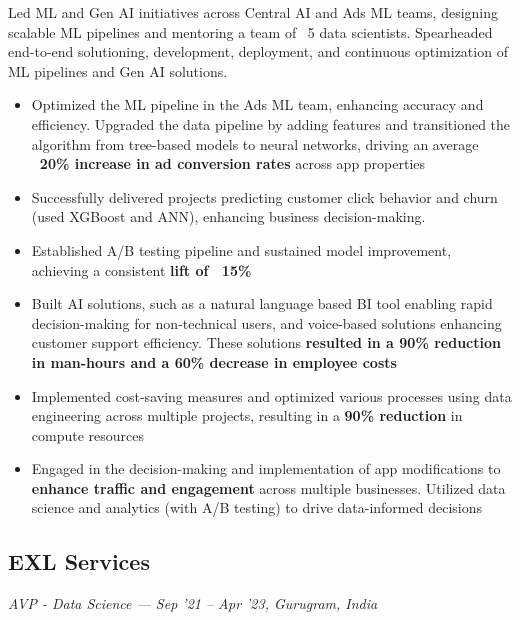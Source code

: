 \documentclass[letterpaper,10pt]{article}
\begin{document}
  Led ML and Gen AI initiatives across Central AI and Ads ML teams, designing scalable ML pipelines and mentoring a team of ~5 data scientists. Spearheaded end-to-end solutioning, development, deployment, and continuous optimization of ML pipelines and Gen AI solutions.
  \begin{itemize}[leftmargin=1em]
    \item Optimized the ML pipeline in the Ads ML team, enhancing accuracy and efficiency. Upgraded the data pipeline by adding features and transitioned the algorithm from tree-based models to neural networks, driving an average \textbf{~20\% increase in ad conversion rates} across app properties
    \item Successfully delivered projects predicting customer click behavior and churn (used XGBoost and ANN), enhancing business decision-making.
    \item Established A/B testing pipeline and sustained model improvement, achieving a consistent \textbf{lift of ~15\%}
    \item Built AI solutions, such as a natural language based BI tool enabling rapid decision-making for non-technical users, and voice-based solutions enhancing customer support efficiency. These solutions \textbf{resulted in a 90\% reduction in man-hours and a 60\% decrease in employee costs}
    \item Implemented cost-saving measures and optimized various processes using data engineering across multiple projects, resulting in a \textbf{90\% reduction} in compute resources
    \item Engaged in the decision-making and implementation of app modifications to \textbf{enhance traffic and engagement} across multiple businesses. Utilized data science and analytics (with A/B testing) to drive data-informed decisions
  \end{itemize}

  \subsection*{EXL Services}
  \textit{AVP - Data Science — Sep '21 -- Apr '23, Gurugram, India}
  \textit{\newline}
\end{document}
